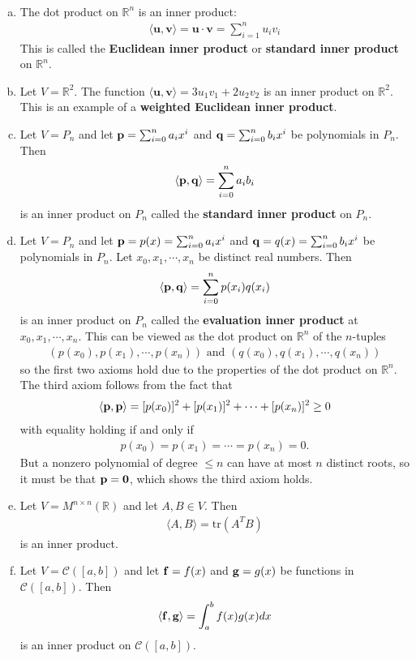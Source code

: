 \documentclass[12pt,letterpaper,reqno]{article}
\numberwithin{equation}{section}
\newcommand{\bv}{\mathbf{v}}
\newcommand{\bu}{\mathbf{u}}
\begin{document}
\begin{example}
\
\begin{enumerate}[(a)]
	\item The dot product on $\mathbb{R}^n$ is an inner product:
	\begin{align*}
		\langle \bu,\bv \rangle = \bu \cdot \bv =\sum_{i=1}^nu_iv_i
	\end{align*}
	This is called the {\bf Euclidean inner product} or {\bf standard inner product} on $\mathbb{R}^n$.
	\item Let $V=\mathbb{R}^2$. The function $\langle \bu,\bv\rangle = 3u_1v_1+2u_2v_2$ is an inner product on $\mathbb{R}^2$. This is an example of a {\bf weighted Euclidean inner product}.
	\item Let $V=P_n$ and let ${\bf p}=\sum_{i=0}^n a_ix^i$ and ${\bf q}=\sum_{i=0}^n b_ix^i$ be polynomials in $P_n$. Then
	\begin{align*}
		\langle {\bf p}, {\bf q}\rangle=\sum_{i=0}^na_ib_i
	\end{align*}
	is an inner product on $P_n$ called the {\bf standard inner product} on $P_n$.
	\item Let $V=P_n$ and let ${\bf p}=p(x)=\sum_{i=0}^n a_ix^i$ and ${\bf q}=q(x)=\sum_{i=0}^n b_ix^i$ be polynomials in $P_n$. Let $x_0, x_1, \cdots,x_n$ be distinct real numbers. Then
	\begin{align*}
		\langle {\bf p}, {\bf q}\rangle = \sum_{i=0}^np(x_i)q(x_i)
	\end{align*}
	is an inner product on $P_n$ called the {\bf evaluation inner product} at $x_0, x_1,\cdots,x_n$. This can be viewed as the dot product on $\mathbb{R}^n$ of the $n$-tuples
	\begin{align*}
		(p(x_0),p(x_1),\cdots,p(x_n)) \text{ and } (q(x_0),q(x_1),\cdots,q(x_n)) 
	\end{align*}
	so the first two axioms hold due to the properties of the dot product on $\mathbb{R}^n$. The third axiom follows from the fact that 
	\begin{align*}
		\langle {\bf p}, {\bf p}\rangle =[p(x_0)]^2+[p(x_1)]^2+\cdots+[p(x_n)]^2 \geq 0
	\end{align*}
	with equality holding if and only if 
	\begin{align*}
		p(x_0)=p(x_1)=\cdots=p(x_n)=0.
	\end{align*}
	But a nonzero polynomial of degree $\leq n$ can have at most $n$ distinct roots, so it must be that ${\bf p}={\bf 0}$, which shows the third axiom holds.
	\item Let $V=M^{n \times n}(\mathbb{R})$ and let $A,B \in V$. Then 
	\begin{align*}
		\langle A,B \rangle = \text{tr}(A^TB)
	\end{align*}
	is an inner product.
	\item Let $V=\mathscr{C}([a,b])$ and let ${\bf f}=f(x)$ and ${\bf g}=g(x)$ be functions in $\mathscr{C}([a,b])$. Then
	\begin{align*}
		\langle {\bf f}, {\bf g}\rangle = \int_a^b f(x)g(x)dx
	\end{align*}
	is an inner product on $\mathscr{C}([a,b])$.
\end{enumerate}	
\end{example}
	
\end{document}
